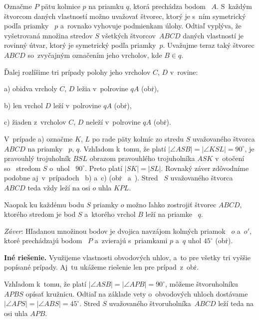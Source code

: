 {%
Označme $P$ pätu kolmice $p$ na priamku $q$, ktorá prechádza bodom~
$A$. S~každým štvorcom daných vlastností možno uvažovať štvorec,
ktorý je s~ním symetrický podľa priamky~ $p$ a~rovnako vyhovuje
podmienkam úlohy. Odtiaľ vyplýva, že vyšetrovaná množina stredov $S$
všetkých štvorcov~$ABC\!D$ daných vlastností je rovinný útvar, ktorý je
symetrický podľa priamky~$p$. Uvažujme teraz taký štvorec $ABC\!D$
so~zvyčajným označením jeho vrcholov, kde $B \in q$.

\smallskip

\noindent
Ďalej rozlíšime tri prípady polohy jeho vrcholov $C$, $D$ v~rovine:

a) obidva vrcholy $C$, $D$ ležia v~polrovine $qA$ (obr\. \obrnum),

b) len vrchol $D$ leží v~polrovine $qA$ (obr\. \obrnum),

c) žiaden z~vrcholov $C$, $D$ neleží v~polrovine $qA$ (obr\. \obrnum).

\vskip12cm

\medbreak
V~prípade a) označme $K$, $L$ po rade päty kolmíc zo stredu $S$
uvažovaného štvorca $ABC\!D$ na priamky~ $p$, $q$. Vzhľadom k~tomu,
že platí $|\angle ASB|=|\angle KSL|=90^{\circ}$, je pravouhlý
trojuholník $BSL$ obrazom pravouhlého trojuholníka $ASK$
v~otočení so~ stredom $S$ o~uhol~ $90^{\circ}$. Preto platí
$|SK|=|SL|$. Rovnaký záver zdôvodníme podobne aj~v~prípadoch~ b)
a~c) (obr\.  ~a~). Stred~ $S$ uvažovaného štvorca $ABC\!D$
teda vždy leží na osi $o$ uhla $KPL$.

Naopak ku každému bodu $S$ priamky $o$ možno ľahko zostrojiť štvorec
$ABC\!D$, ktorého stredom je bod $S$ a~ktorého vrchol $B$ leží na
priamke~ $q$.

{\it Záver\/}: Hľadanou množinou bodov je dvojica navzájom
kolmých priamok~ $o$ a~$o'$, ktoré prechádzajú bodom~ $P$ a~zvierajú
s~priamkami $p$ a~$q$ uhol $45^{\circ}$ (obr\. \obrnum).

\medskip
\newpage
{\bf Iné riešenie.} Využijeme  vlastnosti obvodových uhlov, a~to
pre všetky tri vyššie popísané prípady. Aj~tu ukážeme riešenie len
pre prípad~z~obr\. .

\vskip7cm

Vzhľadom k~tomu, že platí $|\angle ASB|=|\angle AP\!B|=90^{\circ}$,
môžeme štvoruholníku $AP\!BS$ opísať kružnicu. Odtiaľ na základe
vety o~obvodových uhloch dostávame $|\angle APS|=|\angle
ABS|=45^{\circ}$. Stred $S$ uvažovaného štvoruholníka~$ABC\!D$ leží
teda na osi uhla $AP\!B$.
}

